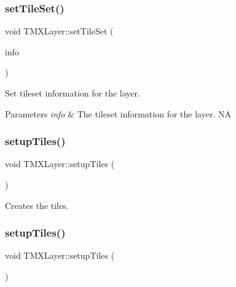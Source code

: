 \subsubsection{\texorpdfstring{set\+Tile\+Set()}{setTileSet()}\hspace{0.1cm}{\footnotesize\ttfamily [2/2]}}
{\footnotesize\ttfamily void T\+M\+X\+Layer\+::set\+Tile\+Set (\begin{DoxyParamCaption}\item[{T\+M\+X\+Tileset\+Info $\ast$}]{info }\end{DoxyParamCaption})\hspace{0.3cm}{\ttfamily [inline]}}

Set tileset information for the layer.


\begin{DoxyParams}{Parameters}
{\em info} & The tileset information for the layer.  NA \\
\hline
\end{DoxyParams}
\mbox{\label{classTMXLayer_acf9d1ea932daf85d00dce917e40049b7}} 
\subsubsection{\texorpdfstring{setup\+Tiles()}{setupTiles()}\hspace{0.1cm}{\footnotesize\ttfamily [1/2]}}
{\footnotesize\ttfamily void T\+M\+X\+Layer\+::setup\+Tiles (\begin{DoxyParamCaption}{ }\end{DoxyParamCaption})}

Creates the tiles. \mbox{\label{classTMXLayer_acf9d1ea932daf85d00dce917e40049b7}} 
\subsubsection{\texorpdfstring{setup\+Tiles()}{setupTiles()}\hspace{0.1cm}{\footnotesize\ttfamily [2/2]}}
{\footnotesize\ttfamily void T\+M\+X\+Layer\+::setup\+Tiles (\begin{DoxyParamCaption}{ }\end{DoxyParamCaption})}

